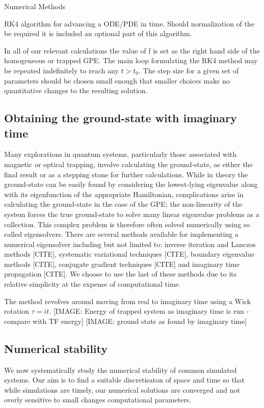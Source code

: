 \begin{chapter}{\label{cha:numerics}Numerical Methods}
\begin{algorithm}[H]
{			
		}
	\caption{RK4 algorithm for advancing a ODE/PDE in time. Should normalization of the be required it is included an optional part of this algorithm.}\label{algo_rk4}
	\end{algorithm}

	In all of our relevant calculations the value of f is set as the right hand side of the homogeneous or trapped GPE. The main loop formulating the RK4 method may be repeated indefinitely to reach any $t>t_0$. The step size for a given set of parameters should be chosen small enough that smaller choices make no quantitative changes to the resulting solution.

	\subsection{\label{section:imagTime} Obtaining the ground-state with imaginary time}
	Many explorations in quantum systems, particularly those associated with magnetic or optical trapping,  involve calculating the ground-state, as either the final result or as a stepping stone for further calculations. While in theory the ground-state can be easily found by considering the lowest-lying eigenvalue along with its eigenfunction of the appropriate Hamiltonian, complications arise in calculating the ground-state in the case of the GPE; the non-linearity of the system forces the true ground-state to solve many linear eigenvalue problems as a collection.	This complex problem is therefore often solved numerically using so called eigensolvers. There are several methods available for implementing a numerical eigensolver including but not limited to: inverse iteration and Lanczos methods [CITE], systematic variational techniques [CITE], boundary eigenvalue methods [CITE], conjugate gradient techniques [CITE] and imaginary time propagation [CITE]. We choose to use the last of these methods due to its relative simplicity at the expense of computational time.

	The method revolves around moving from real to imaginary time using a Wick rotation $\tau = it$.
	[IMAGE: Energy of trapped system as imaginary time is run - compare with TF energy]
	[IMAGE: ground state as found by imaginary time]



	\subsection{\label{section:numericalParams} Numerical stability}
	We now systematically study the numerical stability of common simulated systems. Our aim is to find a suitable discretisaton of space and time so that while simulations are timely, our numerical solutions are converged and not overly sensitive to small changes computational parameters.


\end{chapter}
